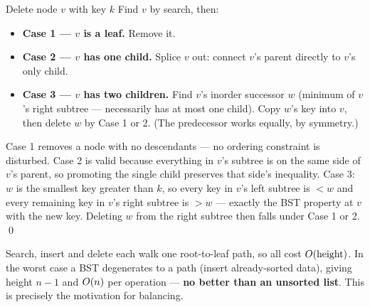 \begin{algo}{Delete node $v$ with key $k$}
Find $v$ by search, then:
\begin{itemize}
  \item \textbf{Case 1 --- $v$ is a leaf.} Remove it.
  \item \textbf{Case 2 --- $v$ has one child.} Splice $v$ out: connect $v$'s parent directly to
        $v$'s only child.
  \item \textbf{Case 3 --- $v$ has two children.} Find $v$'s inorder successor $w$ (minimum of
        $v$'s right subtree --- necessarily has at most one child). Copy $w$'s key into $v$,
        then delete $w$ by Case 1 or 2. (The predecessor works equally, by symmetry.)
\end{itemize}
\end{algo}

\begin{correct}
Case 1 removes a node with no descendants --- no ordering constraint is disturbed.
Case 2 is valid because everything in $v$'s subtree is on the same side of $v$'s parent, so
promoting the single child preserves that side's inequality.
Case 3: $w$ is the smallest key greater than $k$, so every key in $v$'s left subtree is $<w$ and
every remaining key in $v$'s right subtree is $>w$ --- exactly the BST property at $v$ with the
new key. Deleting $w$ from the right subtree then falls under Case 1 or 2. \qed
\end{correct}

\begin{cplx}
Search, insert and delete each walk one root-to-leaf path, so all cost
$O(\text{height})$. In the worst case a BST degenerates to a path (insert already-sorted data),
giving height $n-1$ and $O(n)$ per operation --- \textbf{no better than an unsorted list}. This
is precisely the motivation for balancing.
\end{cplx}

